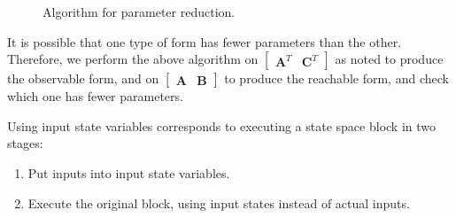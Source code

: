 \begin{figure}[t]







\vspace{-12pt}
\caption{Algorithm for parameter reduction. \protect\label{fig:param}}
\end{figure}

    It is possible that one type of form has fewer parameters than the
other. Therefore, we perform the above algorithm on $\left [
\begin{array} {cc} \mathbf{A}^T & \mathbf{C}^T
\end{array} \right ]$ as noted to produce the observable form, and on $\left [
\begin{array} {cc} \mathbf{A} & \mathbf{B} \end{array} \right
]$ to produce the reachable form, and check which one has fewer
parameters.


Using input state variables corresponds to executing a state space
block in two stages:
\begin{enumerate}
\vspace{\itemshrink} \item Put inputs into input state variables.

\vspace{\itemshrink} \item Execute the original block, using input states instead of
actual inputs.
\vspace{\itemshrink} \end{enumerate}

